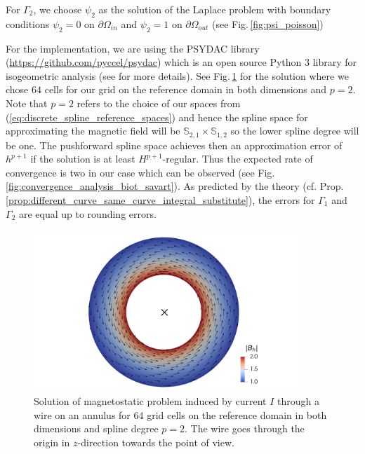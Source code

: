 \documentclass[../master_thesis.tex]{subfiles}
\begin{document}
For $\Gamma_2$, we choose $\psi_2$ as the solution of the Laplace problem with boundary conditions 
$\psi_2 = 0$ on $\partial \Omega_{in}$ and $\psi_2 = 1$ on $\partial \Omega_{out}$ 
(see Fig.\,\ref{fig:psi_poisson})

For the implementation, we are using the PSYDAC library (\url{https://github.com/pyccel/psydac}) 
which is an open source 
Python 3 library 
for isogeometric analysis (see \cite{psydac_paper} for more details).
See Fig.\,\ref{fig:biot_savart_annulus_plot} for the solution where 
we chose $64$ cells for our grid on the reference domain in both dimensions and $p=2$. Note 
that $p=2$ refers to the choice of our spaces from
(\ref{eq:discrete_spline_reference_spaces}) and hence the spline space for approximating 
the magnetic field will be $\mathbb{S}_{2,1} \times \mathbb{S}_{1,2}$ 
so the lower spline degree will be one. 
The pushforward spline space achieves then an approximation error 
of $h^{p+1}$ \cite[Ch.4, (4.48)]{splines_and_pdes} if the solution is at least 
$H^{p+1}$-regular.
Thus the expected rate of 
convergence is two in our case which can be observed 
(see Fig.\,\ref{fig:convergence_analysis_biot_savart}). As predicted by the theory
(cf. Prop.\,\ref{prop:different_curve_same_curve_integral_substitute}),
the errors for $\Gamma_1$ and $\Gamma_2$ are equal up to rounding errors.

\begin{figure}
    \centering
    \includegraphics[width=10cm] {plot_files/biot_savart_annulus/B_h_with_cross.png}
    \caption{Solution of magnetostatic problem induced by current $I$ through a wire on an annulus for 
    $64$ grid cells on the reference domain in both dimensions and spline degree $p=2$. The wire goes 
    through the origin in $z$-direction towards the point of view.
    }
    \label{fig:biot_savart_annulus_plot}
\end{figure}
\end{document}
